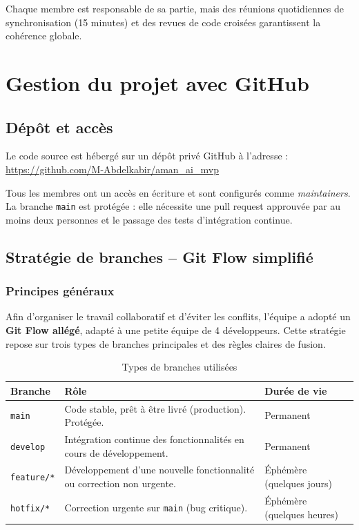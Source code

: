 \documentclass[11pt,a4paper]{article}
\begin{document}
Chaque membre est responsable de sa partie, mais des réunions quotidiennes de synchronisation (15 minutes) et des revues de code croisées garantissent la cohérence globale.

\section{Gestion du projet avec GitHub}
\subsection{Dépôt et accès}
Le code source est hébergé sur un dépôt privé GitHub à l’adresse :\\
\url{https://github.com/M-Abdelkabir/aman_ai_mvp}

Tous les membres ont un accès en écriture et sont configurés comme \textit{maintainers}. La branche \texttt{main} est protégée : elle nécessite une pull request approuvée par au moins deux personnes et le passage des tests d’intégration continue.

\subsection{Stratégie de branches – Git Flow simplifié}
\subsubsection{Principes généraux}
Afin d’organiser le travail collaboratif et d’éviter les conflits, l’équipe a adopté un \textbf{Git Flow allégé}, adapté à une petite équipe de 4 développeurs. Cette stratégie repose sur trois types de branches principales et des règles claires de fusion.

\begin{table}[H]
\centering
\begin{tabular}{p{3cm} p{7cm} p{5cm}}
\toprule
\textbf{Branche} & \textbf{Rôle} & \textbf{Durée de vie} \\
\midrule
\texttt{main} & Code stable, prêt à être livré (production). Protégée. & Permanent \\
\texttt{develop} & Intégration continue des fonctionnalités en cours de développement. & Permanent \\
\texttt{feature/*} & Développement d’une nouvelle fonctionnalité ou correction non urgente. & Éphémère (quelques jours) \\
\texttt{hotfix/*} & Correction urgente sur \texttt{main} (bug critique). & Éphémère (quelques heures) \\
\bottomrule
\end{tabular}
\caption{Types de branches utilisées}
\end{table}
\end{document}
